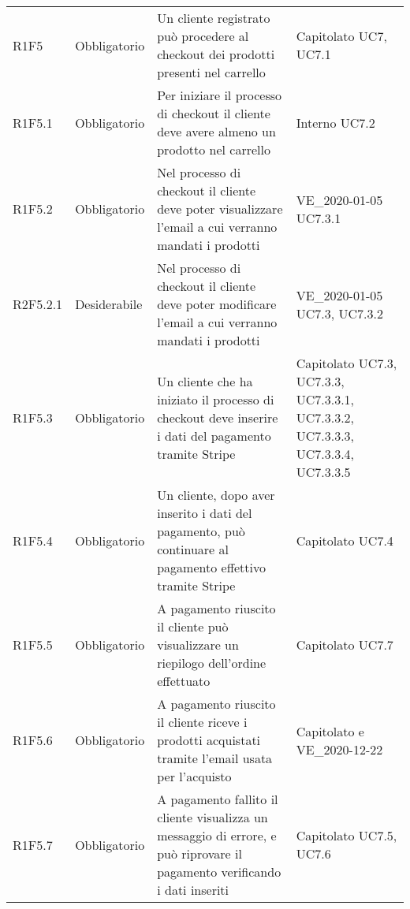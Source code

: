 {\begin{longtable}{C{2.5cm} C{2.8cm} C{6.7cm} C{2.5cm}}
R1F5 & Obbligatorio & Un cliente registrato può procedere al checkout dei prodotti presenti nel carrello & Capitolato \newline UC7, UC7.1\\
R1F5.1 & Obbligatorio & Per iniziare il processo di checkout il cliente deve avere almeno un prodotto nel carrello & Interno \newline UC7.2\\
R1F5.2 & Obbligatorio & Nel processo di checkout il cliente deve poter visualizzare l'email a cui verranno mandati i prodotti & VE\_2020-01-05 \newline UC7.3.1 \\
R2F5.2.1 & Desiderabile & Nel processo di checkout il cliente deve poter modificare l'email a cui verranno mandati i prodotti & VE\_2020-01-05 \newline UC7.3, UC7.3.2 \\
R1F5.3 & Obbligatorio & Un cliente che ha iniziato il processo di checkout deve inserire i dati del pagamento tramite Stripe & Capitolato \newline UC7.3, UC7.3.3, UC7.3.3.1, UC7.3.3.2, UC7.3.3.3, UC7.3.3.4, UC7.3.3.5\\
R1F5.4 & Obbligatorio & Un cliente, dopo aver inserito i dati del pagamento, può continuare al pagamento effettivo tramite Stripe & Capitolato \newline UC7.4\\
R1F5.5 & Obbligatorio & A pagamento riuscito il cliente può visualizzare un riepilogo dell'ordine effettuato & Capitolato \newline UC7.7\\
R1F5.6 & Obbligatorio & A pagamento riuscito il cliente riceve i prodotti acquistati tramite l'email usata per l'acquisto & Capitolato e VE\_2020-12-22 \\
R1F5.7 & Obbligatorio & A pagamento fallito il cliente visualizza un messaggio di errore, e può riprovare il pagamento verificando i dati inseriti & Capitolato \newline UC7.5, UC7.6\\



\end{longtable}}
